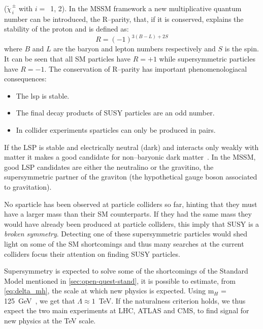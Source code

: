 ($\widetilde{\chi}^{\, \pm}_{\, i}$ with $i = $~1, 2). In the MSSM framework a
new multiplicative quantum number can be introduced, the R--parity, that, if it
is conserved, explains the stability of the proton and is defined as:
\begin{equation}
  \label{eq:54}
  R = (-1)^{3(B - L) + 2S}
\end{equation}
where $B$ and $L$ are the baryon and lepton numbers respectively and $S$ is the
spin. It can be seen that all SM particles have $R = + 1$ while supersymmetric
particles have $R = -1$. The conservation of R--parity has important
phenomenologiacal consequences:
\begin{itemize}
\item The \gls{lsp} is stable.
\item The final decay products of SUSY particles are an odd number.
\item In collider experiments sparticles can only be produced in pairs.
\end{itemize}
If the LSP is stable and electrically neutral (dark) and interacts only weakly
with matter it makes a good candidate for non--baryonic dark
matter~\cite{WIMPS}. In the MSSM, good LSP candidates are either the neutralino
or the gravitino, the supersymmetric partner of the graviton (the hypothetical
gauge boson associated to gravitation).

No sparticle has been observed at particle colliders so far, hinting that they
must have a larger mass than their SM counterparts. If they had the same mass
they would have already been produced at particle colliders, this imply that SUSY is
a \emph{broken symmetry}. Detecting one of these supersymmetric particles would
shed light on some of the SM shortcomings and thus many searches at the current
colliders focus their attention on finding SUSY particles.

Supersymmetry is expected to solve some of the shortcomings of the Standard
Model mentioned in \cref{sec:open-quest-stand}, it is possible to estimate, from
\cref{eq:delta_mh}, the scale at which new physics is expected. Using m$_H$ =
125~GeV~\cite{PDG}, we get that $\Lambda \approx 1$~TeV. If the naturalness
criterion holds, we thus expect the two main experiments at LHC, ATLAS and CMS,
to find signal for new physics at the TeV scale.

